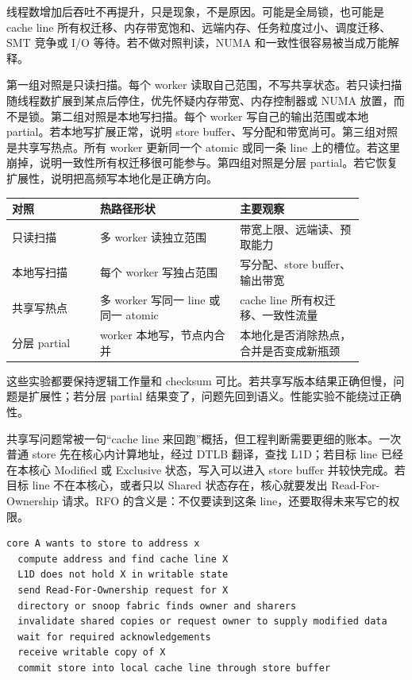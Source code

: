 线程数增加后吞吐不再提升，只是现象，不是原因。可能是全局锁，也可能是 cache line 所有权迁移、内存带宽饱和、远端内存、任务粒度过小、调度迁移、SMT 竞争或 I/O 等待。若不做对照判读，NUMA 和一致性很容易被当成万能解释。

第一组对照是只读扫描。每个 worker 读取自己范围，不写共享状态。若只读扫描随线程数扩展到某点后停住，优先怀疑内存带宽、内存控制器或 NUMA 放置，而不是锁。第二组对照是本地写扫描。每个 worker 写自己的输出范围或本地 partial。若本地写扩展正常，说明 store buffer、写分配和带宽尚可。第三组对照是共享写热点。所有 worker 更新同一个 atomic 或同一条 line 上的槽位。若这里崩掉，说明一致性所有权迁移很可能参与。第四组对照是分层 partial。若它恢复扩展性，说明把高频写本地化是正确方向。

\begin{center}
\begin{tabular}{p{0.22\linewidth}p{0.35\linewidth}p{0.31\linewidth}}
\toprule
对照 & 热路径形状 & 主要观察 \\
\midrule
只读扫描 & 多 worker 读独立范围 & 带宽上限、远端读、预取能力 \\
本地写扫描 & 每个 worker 写独占范围 & 写分配、store buffer、输出带宽 \\
共享写热点 & 多 worker 写同一 line 或同一 atomic & cache line 所有权迁移、一致性流量 \\
分层 partial & worker 本地写，节点内合并 & 本地化是否消除热点，合并是否变成新瓶颈 \\
\bottomrule
\end{tabular}
\end{center}

这些实验都要保持逻辑工作量和 checksum 可比。若共享写版本结果正确但慢，问题是扩展性；若分层 partial 结果变了，问题先回到语义。性能实验不能绕过正确性。

共享写问题常被一句“cache line 来回跑”概括，但工程判断需要更细的账本。一次普通 store 先在核心内计算地址，经过 DTLB 翻译，查找 L1D；若目标 line 已经在本核心 Modified 或 Exclusive 状态，写入可以进入 store buffer 并较快完成。若目标 line 不在本核心，或者只以 Shared 状态存在，核心就要发出 Read-For-Ownership 请求。RFO 的含义是：不仅要读到这条 line，还要取得未来写它的权限。

\begin{lstlisting}[numbers=none,caption={一次共享 store 可能触发的消息链}]
core A wants to store to address x
  compute address and find cache line X
  L1D does not hold X in writable state
  send Read-For-Ownership request for X
  directory or snoop fabric finds owner and sharers
  invalidate shared copies or request owner to supply modified data
  wait for required acknowledgements
  receive writable copy of X
  commit store into local cache line through store buffer
\end{lstlisting}

